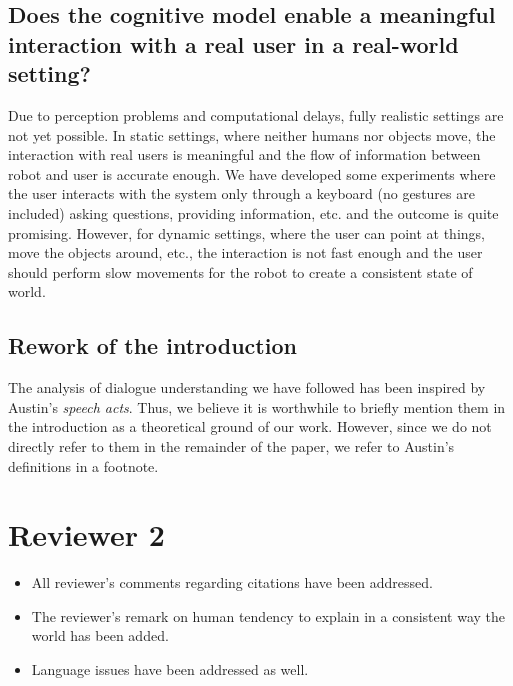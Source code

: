 \documentclass[11pt]{article}
\begin{document}
\subsection{Does the cognitive model enable a meaningful interaction with a
real user in a real-world setting?}

Due to perception problems and computational delays, fully realistic settings
are not yet possible. In static settings, where neither humans nor objects
move, the interaction with real users is meaningful and the flow of information
between robot and user is accurate enough.  We have developed some experiments
where the user interacts with the system only through a keyboard (no gestures
are included) asking questions, providing information, etc. and the outcome is
quite promising. However, for dynamic settings, where the user can point at
things, move the objects around, etc., the interaction is not fast enough and
the user should perform slow movements for the robot to create a consistent
state of world.

\subsection{Rework of the introduction} 


The analysis of dialogue understanding we have followed has been inspired by
Austin's \emph{speech acts}. Thus, we believe it is worthwhile to briefly mention
them in the introduction as a theoretical ground of our work. However, since we do not directly refer to them in the remainder of the paper,
we refer to Austin's definitions in a footnote.

\section{Reviewer 2}

\begin{itemize}
\item All reviewer's comments regarding citations have been addressed.
\item The reviewer's remark on human tendency to explain in a consistent way the world has been added.
\item Language issues have been addressed as well.
\end{itemize}
\end{document}

